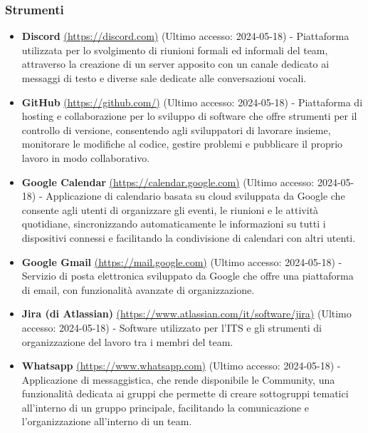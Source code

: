 \subsubsection{Strumenti}
\begin{itemize}
    \item \textbf{Discord} \href{https://discord.com}{(https://discord.com)} (Ultimo accesso: 2024-05-18) - Piattaforma utilizzata per lo svolgimento di riunioni formali ed informali del team, attraverso la creazione di un server apposito con un canale dedicato ai messaggi di testo e diverse sale dedicate alle conversazioni vocali.
    
    \item \textbf{GitHub} \href{https://github.com/}{(https://github.com/)} (Ultimo accesso: 2024-05-18) - Piattaforma di hosting e collaborazione per lo sviluppo di software che offre strumenti per il controllo di versione, consentendo agli sviluppatori di lavorare insieme, monitorare le modifiche al codice, gestire problemi e pubblicare il proprio lavoro in modo collaborativo.
    
    \item \textbf{Google Calendar} \href{https://calendar.google.com}{(https://calendar.google.com)} (Ultimo accesso: 2024-05-18) - Applicazione di calendario basata su cloud sviluppata da Google che consente agli utenti di organizzare gli eventi, le riunioni e le attività quotidiane, sincronizzando automaticamente le informazioni su tutti i dispositivi connessi e facilitando la condivisione di calendari con altri utenti.
    
    \item \textbf{Google Gmail} \href{https://mail.google.com}{(https://mail.google.com)} (Ultimo accesso: 2024-05-18) - Servizio di posta elettronica sviluppato da Google che offre una piattaforma di email, con funzionalità avanzate di organizzazione.
    
    \item \textbf{Jira (di Atlassian)} \href{https://www.atlassian.com/it/software/jira}{(https://www.atlassian.com/it/software/jira)} (Ultimo accesso: 2024-05-18) - Software utilizzato per l'ITS e gli strumenti di organizzazione del lavoro tra i membri del team.
    
    \item \textbf{Whatsapp} \href{https://www.whatsapp.com}{(https://www.whatsapp.com)} (Ultimo accesso: 2024-05-18) - Applicazione di messaggistica, che rende disponibile le Community, una funzionalità dedicata ai gruppi che permette di creare sottogruppi tematici all'interno di un gruppo principale, facilitando la comunicazione e l'organizzazione all'interno di un team.
    

\end{itemize}

